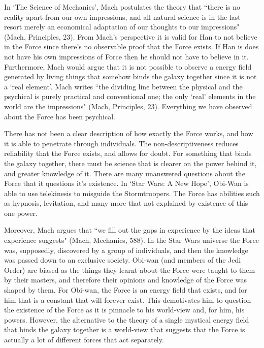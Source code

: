 \documentclass[11pt, oneside]{article}
\begin{document}
\par In `The Science of Mechanics', Mach postulates the theory that ``there is no reality apart from our own impressions, and all natural science is in the last resort merely an economical adaptation of our thoughts to our impressions" (Mach, Principles, 23). From Mach's perspective it is valid for Han to not believe in the Force since there's no observable proof that the Force exists. If Han is does not have his own impressions of Force then he should not have to believe in it. Furthermore, Mach would argue that it is not possible to observe a energy field generated by living things that somehow binds the galaxy together since it is not a `real element'. Mach writes ``the dividing line between the physical and the psychical is purely practical and conventional one; the only `real' elements in the world are the impressions" (Mach, Principles, 23). Everything we have observed about the Force has been psychical.

\par There has not been a clear description of how exactly the Force works, and how it is able to penetrate through individuals. The non-descriptiveness reduces reliability that the Force exists, and allows for doubt. For something that binds the galaxy together, there must be science that is clearer on the power behind it, and greater knowledge of it. There are many unanswered questions about the Force that it questions it's existence. In `Star Wars: A New Hope', Obi-Wan is able to use telekinesis to misguide the Stormtroopers. The Force has abilities such as hypnosis, levitation, and many more that not explained by existence of this one power. 

\par Moreover, Mach argues that ``we fill out the gaps in experience by the ideas that experience suggests" (Mach, Mechanics, 588). In the Star Wars universe the Force was, supposedly, discovered by a group of individuals, and then the knowledge was passed down to an exclusive society. Obi-wan (and members of the Jedi Order) are biased as the things they learnt about the Force were taught to them by their masters, and therefore their opinions and knowledge of the Force was shaped by them. For Obi-wan, the Force is an energy field that exists, and for him that is a constant that will forever exist. This demotivates him to question the existence of the Force as it is pinnacle to his world-view and, for him, his powers. However, the alternative to the theory of a single mystical energy field that binds the galaxy together is a world-view that suggests that the Force is actually a lot of different forces that act separately.
\end{document}
